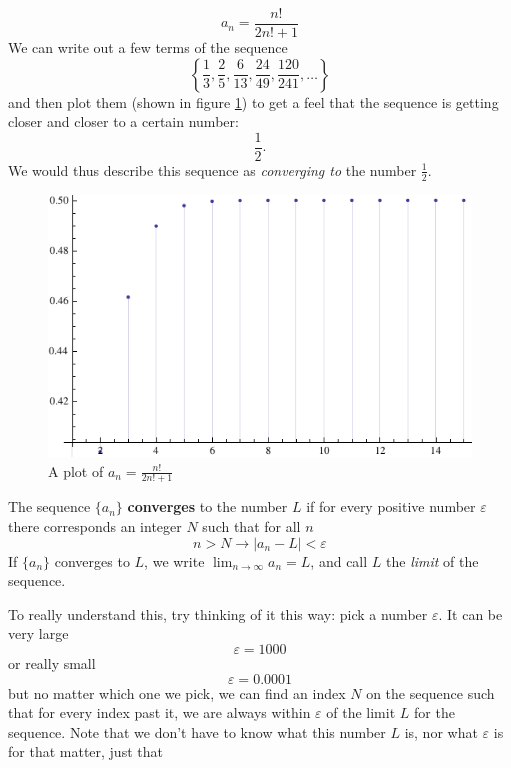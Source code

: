 \begin{ex}
\[ a_n = \frac{n!}{2n!+1} \]
  We can write out a few terms of the sequence
  \[
    \left\{
      \frac{1}{3},\frac{2}{5},\frac{6}{13},\frac{24}{49},\frac{120}{241},
    \ldots \right\}
  \]
  and then plot them (shown in figure \ref{fig:firstsequence}) to get a feel that the
  sequence is getting closer and closer to a certain number: \[ \frac{1}{2}.\] We would
  thus describe this sequence as \emph{converging to} the number \( \frac{1}{2} \).
  \begin{figure}[h]
    \begin{center}
      \includegraphics{graphs/nf2nfp1.pdf}
    \end{center}
    \label{fig:firstsequence}
    \caption{A plot of \( a_n = \frac{n!}{2n!+1} \)}
  \end{figure}
\end{ex}
\begin{defn}
  The sequence \(\{ a_n \}\) \textbf{converges} to the number \(L\) if for every
  positive number \(\varepsilon\) there corresponds an integer \(N\) such that
  for all \(n\)
  \[ n > N \to |a_n - L| < \varepsilon \]
  If \(\{a_n\}\) converges to \(L\), we write \(\lim_{n \to \infty} a_n = L\),
  and call \(L\) the \emph{limit} of the sequence.
\end{defn}
  To really understand this, try thinking of it this way: pick a number $\varepsilon$. It can be very large
  \[ \varepsilon=1000\]
  or really small
  \[ \varepsilon=0.0001\]
  but no matter which one we pick, we can find an index $N$ on the sequence such that for every index past it, we
  are always within $\varepsilon$ of the limit $L$ for the sequence.
  Note that we don't have to know what this number $L$ is, nor what $\varepsilon$ is for that matter, just that
